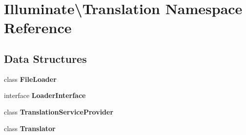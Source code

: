 \section{Illuminate\textbackslash{}Translation Namespace Reference}
\label{namespace_illuminate_1_1_translation}
\subsection*{Data Structures}
\begin{DoxyCompactItemize}
\item 
class {\bf File\+Loader}
\item 
interface {\bf Loader\+Interface}
\item 
class {\bf Translation\+Service\+Provider}
\item 
class {\bf Translator}
\end{DoxyCompactItemize}
